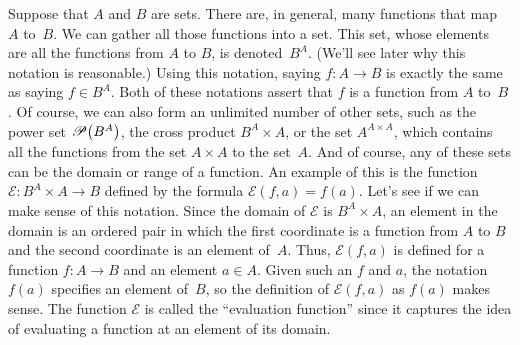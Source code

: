 Suppose that $A$ and $B$ are sets.  There are, in general, many
functions that map $A$ to~$B$.  We can gather all those functions
into a set.  This set, whose elements are
all the functions from $A$ to $B$, is denoted~$B^A$.
(We'll see later why this notation is reasonable.)  Using this notation,
saying $f\colon A\to B$ is exactly the same as saying
$f\in B^A$.  Both of these notations assert that $f$ is a function
from $A$ to~$B$.  Of course, we can also form an unlimited number
of other sets, such as the power set ${\mathscr P}\big(B^A\big)$,
the cross product $B^A\times A$, or the set $A^{A\times A}$,
which contains all the functions from the set $A\times A$
to the set~$A$.  And of course, any of these sets can be
the domain or range of a function.  An example of this
is the function ${\mathscr E}\colon B^A\times A\to B$ defined
by the formula ${\mathscr E}(f,a) = f(a)$.  Let's see if
we can make sense of this notation.  Since the domain of
${\mathscr E}$ is $B^A\times A$, an element in the domain
is an ordered pair in which the first coordinate is a function
from $A$ to $B$ and the second coordinate is an element of~$A$.
Thus, ${\mathscr E}(f,a)$ is defined for a function $f\colon A\to B$
and an element $a\in A$.  Given such an $f$ and $a$, the notation
$f(a)$ specifies an element of~$B$, so the definition of
${\mathscr E}(f,a)$ as $f(a)$ makes sense.  The function ${\mathscr E}$
is called the ``evaluation function'' since it captures the idea
of evaluating a function at an element of its domain.



